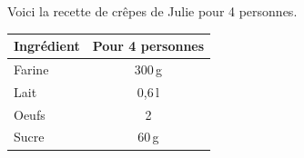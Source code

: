 
\question
Voici la recette de crêpes de Julie pour 4 personnes.

\vspace{5pt}\def\arraystretch{2}
\begin{tabularx}{\linewidth}{|p{3cm}|C|}
\hline
{}\textbf{Ingrédient} & \textbf{Pour 4 personnes}\\
\hline
Farine & 300\,g\\
\hline
Lait & 0,6\,l\\
\hline
Oeufs & 2\\
\hline
Sucre & 60\,g\\
\hline
\end{tabularx}
\def\arraystretch{1}

